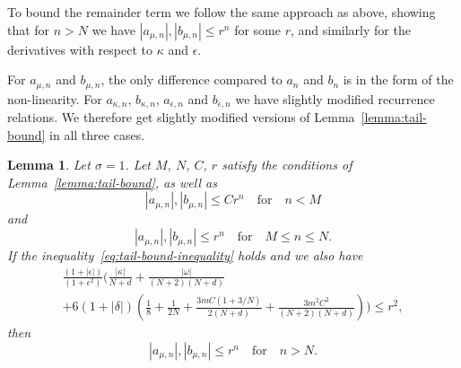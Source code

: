 \documentclass[11pt]{article}
\newtheorem{lemma}[definition]{Lemma}
\begin{document}
To bound the remainder term we follow the same approach as above,
showing that for \(n > N\) we have
\(|a_{\mu,n}|, |b_{\mu,n}| \leq r^{n}\) for some \(r\), and similarly
for the derivatives with respect to \(\kappa\) and \(\epsilon\).

For \(a_{\mu,n}\) and \(b_{\mu,n}\), the only difference compared to
\(a_{n}\) and \(b_{n}\) is in the form of the non-linearity. For
\(a_{\kappa,n}\), \(b_{\kappa,n}\), \(a_{\epsilon,n}\) and
\(b_{\epsilon,n}\) we have slightly modified recurrence relations. We
therefore get slightly modified versions of
Lemma~\ref{lemma:tail-bound} in all three cases.

\begin{lemma}\label{lemma:tail-bound-dmu}
  Let \(\sigma = 1\). Let \(M\), \(N\), \(C\), \(r\) satisfy the
  conditions of Lemma~\ref{lemma:tail-bound}, as well as
  \begin{equation*}
    |a_{\mu,n}|, |b_{\mu,n}| \leq C r^{n} \quad\text{for}\quad n < M
  \end{equation*}
  and
  \begin{equation*}
    |a_{\mu,n}|, |b_{\mu,n}| \leq r^{n} \quad\text{for}\quad M \leq n \leq N.
  \end{equation*}
  If the inequality~\eqref{eq:tail-bound-inequality} holds and we also
  have
  \begin{multline}
    \label{eq:tail-bound-inequality-dmu}
    \frac{(1 + |\epsilon|)}{(1 + \epsilon^{2})}\Bigg(
    \frac{|\kappa|}{N + d}
    + \frac{|\omega|}{(N + 2)(N + d)}\\
    + 6(1 + |\delta|)\left(
      \frac{1}{8} + \frac{1}{2N}
      + \frac{3mC(1 + 3/N)}{2(N + d)}
      + \frac{3m^{2}C^{2}}{(N + 2)(N + d)}
    \right)
    \Bigg) \leq r^2,
  \end{multline}
  then
  \begin{equation*}
    |a_{\mu,n}|, |b_{\mu,n}| \leq r^{n} \quad\text{for}\quad n > N.
  \end{equation*}
\end{lemma}
\end{document}
